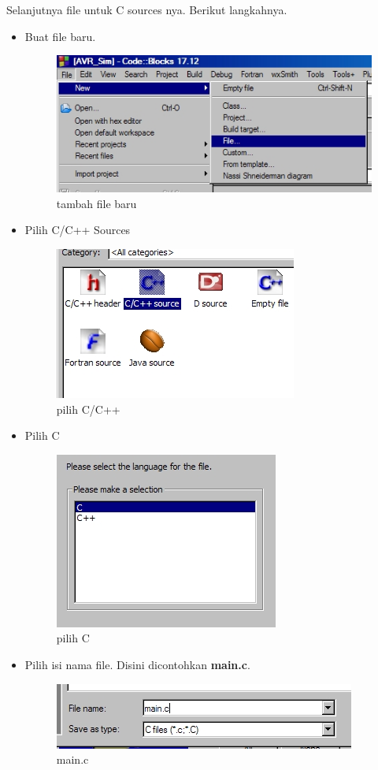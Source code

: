 \documentclass[12pt,]{article}
\begin{document}
	Selanjutnya file untuk C sources nya.
	Berikut langkahnya.
	\begin{itemize}
		\item Buat file baru.
		\begin{figure}[H]
			\centering
			\includegraphics[width=0.5\linewidth]{images/hello_a9}
			\caption{tambah file baru}
		\end{figure}

		\item Pilih C/C++ Sources
		\begin{figure}[H]
			\centering
			\includegraphics[width=0.5\linewidth]{images/hello_a10}
			\caption{pilih C/C++}
		\end{figure}

		\item Pilih C
		\begin{figure}[H]
			\centering
			\includegraphics[width=0.5\linewidth]{images/hello_a11}
			\caption{pilih C}
		\end{figure}

		\newpage
		\item Pilih isi nama file.
		Disini dicontohkan \textbf{main.c}.
		\begin{figure}[H]
			\centering
			\includegraphics[width=0.5\linewidth]{images/hello_a12}
			\caption{main.c}
		\end{figure}


\end{itemize}
\end{document}
